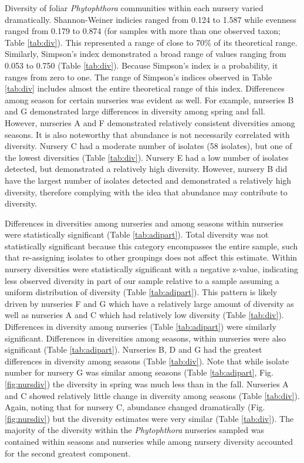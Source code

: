 \documentclass[12pt]{article}
\begin{document}
Diversity of foliar \emph{Phytophthora} communities within each nursery varied dramatically.  Shannon-Weiner indicies ranged from 0.124 to 1.587 while evenness ranged from 0.179 to 0.874 (for samples with more than one observed taxon; Table \ref{tab:div}).  This represented a range of close to 70\% of its theoretical range.  Similarly, Simpson's index demonstrated a broad range of values ranging from 0.053 to 0.750 (Table \ref{tab:div}).  Because Simpson's index is a probability, it ranges from zero to one.  The range of Simpson's indices observed in Table \ref{tab:div} includes almost the entire theoretical range of this index.  Differences among season for certain nurseries was evident as well.  For example, nurseries B and G demonstrated large differences in diversity among spring and fall.  However, nurseries A and F demonstrated relatively consistent diversities among seasons.  It is also noteworthy that abundance is not necessarily correlated with diversity.  Nursery C had a moderate number of isolates (58 isolates), but one of the lowest diversities (Table \ref{tab:div}).  Nursery E had a low number of isolates detected, but demonstrated a relatively high diversity.  However, nursery B did have the largest number of isolates detected and demonstrated a relatively high diversity, therefore complying with the idea that abundance may contribute to diversity.

Differences in diversities among nurseries and among seasons within nurseries were statistically significant (Table \ref{tab:adipart}).  Total diversity was not statistically significant because this category encompasses the entire sample, such that re-assigning isolates to other groupings does not affect this estimate.  Within nursery diversities were statistically significant with a negative z-value, indicating less observed diversity in part of our sample relative to a sample assuming a uniform distribution of diversity (Table \ref{tab:adipart}).  This pattern is likely driven by nurseries F and G which have a relatively large amount of diversity as well as nurseries A and C which had relatively low diversity (Table \ref{tab:div}).  Differences in diversity among nurseries (Table \ref{tab:adipart}) were similarly significant.  Differences in diversities among seasons, within nurseries were also significant (Table \ref{tab:adipart}).  Nurseries B, D and G had the greatest differences in diversity among seasons (Table \ref{tab:div}).  Note that while isolate number for nursery G was similar among seasons (Table \ref{tab:adipart}, Fig. \ref{fig:nursdiv}) the diversity in spring was much less than in the fall.  Nurseries A and C showed relatively little change in diversity among seasons (Table \ref{tab:div}).  Again, noting that for nursery C, abundance changed dramatically (Fig. \ref{fig:nursdiv}) but the diversity estimates were very similar (Table \ref{tab:div}).  The majority of the diversity within the \emph{Phytophthora} nurseries sampled was contained within seasons and nurseries while among nursery diversity accounted for the second greatest component.
\end{document}
